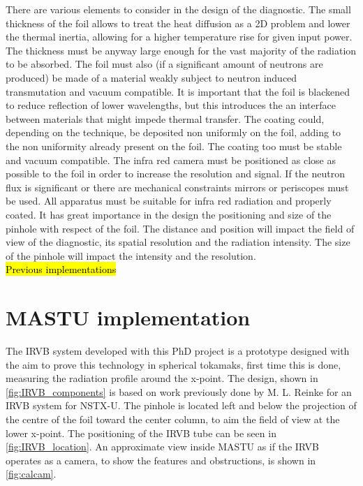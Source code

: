 There are various elements to consider in the design of the diagnostic.
The small thickness of the foil allows to treat the heat diffusion as a 2D problem and lower the thermal inertia, allowing for a higher temperature rise for given input power. The thickness must be anyway large enough for the vast majority of the radiation to be absorbed. The foil must also (if a significant amount of neutrons are produced) be made of a material weakly subject to neutron induced transmutation and vacuum compatible.\cite{Mukai2021}
It is important that the foil is blackened to reduce reflection of lower wavelengths, but this introduces the an interface between materials that might impede thermal transfer. The coating could, depending on the technique, be deposited non uniformly on the foil, adding to the non uniformity already present on the foil. The coating too must be stable and vacuum compatible. \cite{Mukai2016}
The infra red camera must be positioned as close as possible to the foil in order to increase the resolution and signal. If the neutron flux is significant or there are mechanical constraints mirrors or periscopes must be used. All apparatus must be suitable for infra red radiation and properly coated.
It has great importance in the design the positioning and size of the pinhole with respect of the foil. The distance and position will impact the field of view of the diagnostic, its spatial resolution and the radiation intensity. The size of the pinhole will impact the intensity and the resolution.\\
\hl{Previous implementations}


\section{MASTU implementation}

The IRVB system developed with this PhD project is a prototype designed with the aim to prove this technology in spherical tokamaks, first time this is done, measuring the radiation profile around the x-point. The design, shown in \autoref{fig:IRVB_components} is based on work previously done by M. L. Reinke for an IRVB system for NSTX-U.\cite{VanEden2016} The pinhole is located left and below the projection of the centre of the foil toward the center column, to aim the field of view at the lower x-point. The positioning of the IRVB tube can be seen in \autoref{fig:IRVB_location}. An approximate view inside MASTU as if the IRVB operates as a camera, to show the features and obstructions, is shown in \autoref{fig:calcam}.

